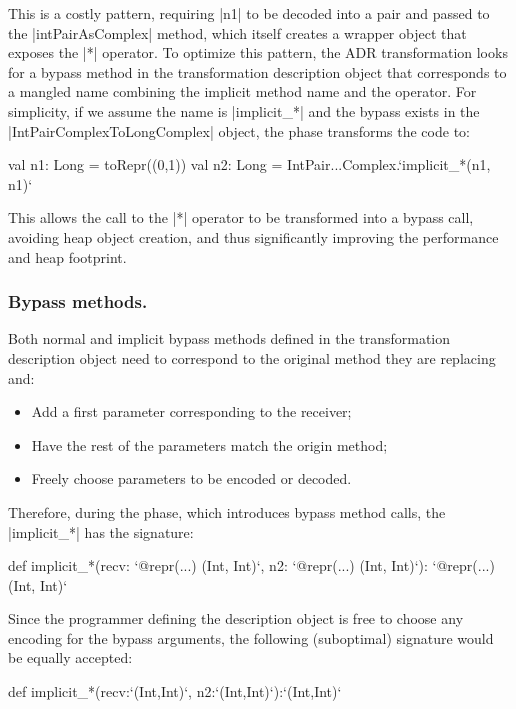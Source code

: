 This is a costly pattern, requiring |n1| to be decoded into a pair and passed to the |intPairAsComplex| method, which itself creates a wrapper object that exposes the |*| operator. To optimize this pattern, the ADR transformation looks for a bypass method in the transformation description object that corresponds to a mangled name combining the implicit method name and the operator. For simplicity, if we assume the name is |implicit_*| and the bypass exists in the |IntPairComplexToLongComplex| object, the \coerce{} phase transforms the code to:

\begin{lstlisting-nobreak}
val n1: Long = toRepr((0,1))
val n2: Long = IntPair...Complex.`implicit_*(n1, n1)`
\end{lstlisting-nobreak}

This allows the call to the |*| operator to be transformed into a bypass call, avoiding heap object creation, and thus significantly improving the performance and heap footprint.


\subsubsection*{Bypass methods.} Both normal and implicit bypass methods defined in the transformation description object need to correspond to the original method they are replacing and:

\begin{itemize}
\item Add a first parameter corresponding to the receiver;
\item Have the rest of the parameters match the origin method;
\item Freely choose parameters to be encoded or decoded.
\end{itemize}

Therefore, during the \coerce{} phase, which introduces bypass method calls, the |implicit_*| has the signature:

\begin{lstlisting-nobreak}
def implicit_*(recv: `@repr(...) (Int, Int)`,  n2: `@repr(...) (Int, Int)`): `@repr(...) (Int, Int)`
\end{lstlisting-nobreak}

Since the programmer defining the description object is free to choose any encoding for the bypass arguments, the following (suboptimal) signature would be equally accepted:

\begin{lstlisting-nobreak}
def implicit_*(recv:`(Int,Int)`, n2:`(Int,Int)`):`(Int,Int)`
\end{lstlisting-nobreak}

